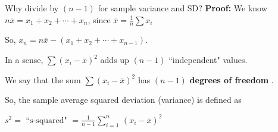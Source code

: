 \documentclass{beamer}\usepackage[]{graphicx}\usepackage[]{color}
\newcommand{\xbar}{\overline{x}}
\begin{document}
\begin{frame}{Why divide by $(n-1)$ for sample variance and SD?\;\;}
\textbf{Proof:}\;
We know $n\xbar = x_1+x_2+\cdots +x_n$, since
$\xbar = \frac{1}{n} \sum x_i$

So, $x_n = n\xbar - (x_1+x_2+\cdots+x_{n-1})$.

\vskip0.4cm
In a sense, $\sum (x_i-\xbar)^2$  
adds up $(n-1)$ ``independent" values.
\vskip0.1cm

We say that the sum $\sum (x_i-\xbar)^2$
has $(n-1)$ \textbf{degrees of freedom} .
\vskip0.1cm

So, the sample average squared deviation (variance) is defined as
\vskip0.4cm

$\displaystyle{
s^2 = \mbox{ ``s-squared" }
= \frac{1}{n-1} \sum_{i=1}^n\, (x_i-\overline{x})^2
}$

\end{frame}
\end{document}
